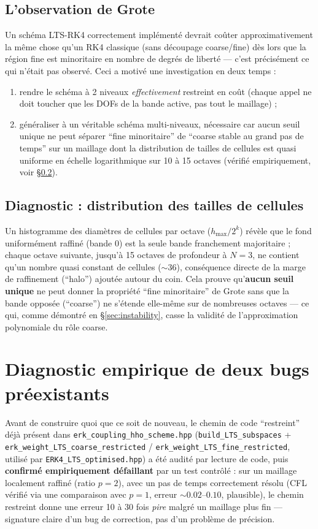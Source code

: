 \documentclass[11pt]{article}
\newcommand{\code}[1]{\texttt{#1}}
\begin{document}
\subsection{L'observation de Grote}

Un schéma LTS-RK4 correctement implémenté devrait coûter approximativement
la même chose qu'un RK4 classique (sans découpage coarse/fine) dès lors que
la région fine est minoritaire en nombre de degrés de liberté --- c'est
précisément ce qui n'était pas observé. Ceci a motivé une investigation en
deux temps :
\begin{enumerate}
  \item rendre le schéma à 2 niveaux \emph{effectivement} restreint en
  coût (chaque appel ne doit toucher que les DOFs de la bande active, pas
  tout le maillage) ;
  \item généraliser à un véritable schéma multi-niveaux, nécessaire car
  aucun seuil unique ne peut séparer ``fine minoritaire'' de ``coarse
  stable au grand pas de temps'' sur un maillage dont la distribution de
  tailles de cellules est quasi uniforme en échelle logarithmique sur 10 à
  15 octaves (vérifié empiriquement, voir \S\ref{sec:histogram}).
\end{enumerate}

\subsection{Diagnostic : distribution des tailles de cellules}
\label{sec:histogram}

Un histogramme des diamètres de cellules par octave ($h_{\max}/2^{k}$)
révèle que le fond uniformément raffiné (bande 0) est la seule bande
franchement majoritaire ; chaque octave suivante, jusqu'à 15 octaves de
profondeur à $N=3$, ne contient qu'un nombre quasi constant de cellules
($\sim 36$), conséquence directe de la marge de raffinement (``halo'')
ajoutée autour du coin. Cela prouve qu'\textbf{aucun seuil unique} ne peut
donner la propriété ``fine minoritaire'' de Grote sans que la bande
opposée (``coarse'') ne s'étende elle-même sur de nombreuses octaves --- ce
qui, comme démontré en \S\ref{sec:instability}, casse la validité de
l'approximation polynomiale du rôle coarse.

\section{Diagnostic empirique de deux bugs préexistants}
\label{sec:bugs}

Avant de construire quoi que ce soit de nouveau, le chemin de code
``restreint'' déjà présent dans \code{erk\_coupling\_hho\_scheme.hpp}
(\code{build\_LTS\_subspaces} + \code{erk\_weight\_LTS\_coarse\_restricted}
/ \code{erk\_weight\_LTS\_fine\_restricted}, utilisé par
\code{ERK4\_LTS\_optimised.hpp}) a été audité par lecture de code, puis
\textbf{confirmé empiriquement défaillant} par un test contrôlé : sur un
maillage localement raffiné (ratio $p=2$), avec un pas de temps
correctement résolu (CFL vérifié via une comparaison avec $p=1$, erreur
$\sim 0.02$--$0.10$, plausible), le chemin restreint donne une erreur 10 à
30 fois \emph{pire} malgré un maillage plus fin --- signature claire d'un
bug de correction, pas d'un problème de précision.
\end{document}
